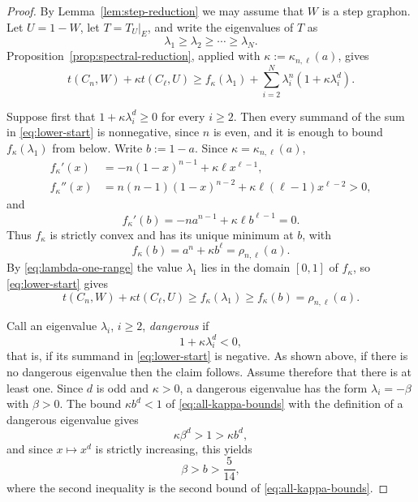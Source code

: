 \documentclass[11pt]{article}
\theoremstyle{definition}
\theoremstyle{remark}
\begin{document}
\begin{proof}
  By Lemma~\ref{lem:step-reduction} we may assume that $W$ is a step
  graphon.  Let $U=1-W$, let $T=T_U|_E$, and write the eigenvalues of $T$ as
  \[
    \lambda_1\ge\lambda_2\ge\cdots\ge\lambda_N.
  \]
  Proposition~\ref{prop:spectral-reduction}, applied with
  $\kappa:=\kappa_{n,\ell}(a)$, gives
  \begin{equation}
    t(C_n,W)+\kappa t(C_\ell,U)
    \ge f_\kappa(\lambda_1)
      +\sum_{i=2}^N\lambda_i^n(1+\kappa\lambda_i^d).
    \label{eq:lower-start}
  \end{equation}

  Suppose first that $1+\kappa\lambda_i^d\ge0$ for every $i\ge2$.  Then every
  summand of the sum in \eqref{eq:lower-start} is nonnegative, since $n$ is
  even, and it is enough to bound $f_\kappa(\lambda_1)$ from below.  Write
  $b:=1-a$.  Since $\kappa=\kappa_{n,\ell}(a)$,
  \begin{align*}
    f_\kappa'(x)
    &=-n(1-x)^{n-1}+\kappa\ell x^{\ell-1},\\
    f_\kappa''(x)
    &=n(n-1)(1-x)^{n-2}
      +\kappa\ell(\ell-1)x^{\ell-2}>0,
  \end{align*}
  and
  \[
    f_\kappa'(b)
    =-na^{n-1}+\kappa\ell b^{\ell-1}=0.
  \]
  Thus $f_\kappa$ is strictly convex and has its unique minimum at $b$, with
  \[
    f_\kappa(b)
    =a^n+\kappa b^\ell
    =\rho_{n,\ell}(a).
  \]
  By \eqref{eq:lambda-one-range} the value $\lambda_1$ lies in the domain
  $[0,1]$ of $f_\kappa$, so \eqref{eq:lower-start} gives
  \[
    t(C_n,W)+\kappa t(C_\ell,U)
    \ge f_\kappa(\lambda_1)
    \ge f_\kappa(b)
    =\rho_{n,\ell}(a).
  \]

  Call an eigenvalue $\lambda_i$, $i\ge2$, \emph{dangerous} if
  \[
    1+\kappa\lambda_i^d<0,
  \]
  that is, if its summand in \eqref{eq:lower-start} is negative.  As shown
  above, if there is no dangerous eigenvalue then the claim follows.  Assume
  therefore that there is at least one.  Since $d$ is odd and $\kappa>0$, a
  dangerous eigenvalue has the form $\lambda_i=-\beta$ with $\beta>0$.  The
  bound $\kappa b^d<1$ of \eqref{eq:all-kappa-bounds} with the definition of
  a dangerous eigenvalue gives
  \[
    \kappa\beta^d>1>\kappa b^d,
  \]
  and since $x\mapsto x^d$ is strictly increasing, this yields
  \begin{equation}
    \beta>b>\frac5{14},
    \label{eq:dangerous-magnitude}
  \end{equation}
  where the second inequality is the second bound of
  \eqref{eq:all-kappa-bounds}.


\end{proof}
\end{document}
